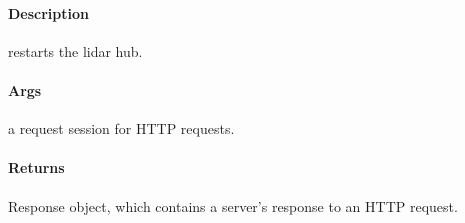 \documentclass[letterpaper,10pt,english]{sphinxmanual}
\begin{document}
\begin{fulllineitems}
\label{\detokenize{gemini_lidar_hub_API:gemini_lidar_hub_API.reset_lidar_hub}}
\pysigstartsignatures
{}
\pysigstopsignatures

\paragraph{Description}
\label{\detokenize{gemini_lidar_hub_API:id38}}
\sphinxAtStartPar
restarts the lidar hub.


\paragraph{Args}
\label{\detokenize{gemini_lidar_hub_API:id39}}\begin{description}
\sphinxAtStartPar
a request session for HTTP requests.

\end{description}


\paragraph{Returns}
\label{\detokenize{gemini_lidar_hub_API:id40}}\begin{description}
\sphinxAtStartPar
Response object, which contains a server’s response to an HTTP request.

\end{description}

\end{fulllineitems}

\end{document}
